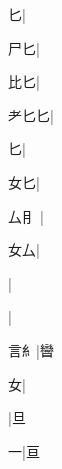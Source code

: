 \begin{multicols}{2}
{{匕}\mktsJzrVerticalBar{}{\cjk{}{\cnsym{}　}{\cnsym{}　}{\cnsym{}　}}|{}\par
{\cjk{}{\cnsym{}　}尸匕}\mktsJzrVerticalBar{}{\cjk{}{\cnsym{}　}{\cnsym{}　}{\cnsym{}　}}|{}\par
{比匕}\mktsJzrVerticalBar{}{\cjk{}{\cnsym{}　}{\cnsym{}　}{\cnsym{}　}}|{}\par
{\cjk{}耂匕匕}\mktsJzrVerticalBar{}{\cjk{}{\cnsym{}　}{\cnsym{}　}{\cnsym{}　}}|{}\par
{匕}\mktsJzrVerticalBar{}{\cjk{}{\cnsym{}　}{\cnsym{}　}{\cnsym{}　}}|{}\par
{\cjk{}{\cnsym{}　}女匕}\mktsJzrVerticalBar{}{\cjk{}{\cnsym{}　}{\cnsym{}　}{\cnsym{}　}}|{}\par
{\cjk{}厶{\cnxHanaA{}⺝}{\cnjzr{}}}\mktsJzrVerticalBar{}{\cjk{}{\cnsym{}　}{\cnsym{}　}{\cnsym{}　}}|{}\par
{\cjk{}{\cnsym{}　}女厶}\mktsJzrVerticalBar{}{\cjk{}{\cnsym{}　}{\cnsym{}　}{\cnsym{}　}}|{}\par
{}\mktsJzrVerticalBar{}{\cjk{}{\cnsym{}　}{\cnsym{}　}{\cnsym{}　}}|{}\par
{}\mktsJzrVerticalBar{}{\cjk{}{\cnsym{}　}{\cnsym{}　}{\cnsym{}　}}|{}\par
{言{糹}}\mktsJzrVerticalBar{}{\cjk{}{\cnsym{}　}{\cnsym{}　}{\cnsym{}　}}|{\cjk{}曫}\par
{\cjk{}{\cnsym{}　}{\cnsym{}　}女}\mktsJzrVerticalBar{}{\cjk{}{\cnsym{}　}{\cnsym{}　}{\cnsym{}　}}|{}\par
{\cjk{}{\cnsym{}　}{\cnsym{}　}{\cnsym{}　}}|{\cjk{}旦}\par
{\cjk{}{\cnsym{}　}{\cnsym{}　}一}|{\cjk{}亘}\par
}
\end{multicols}
